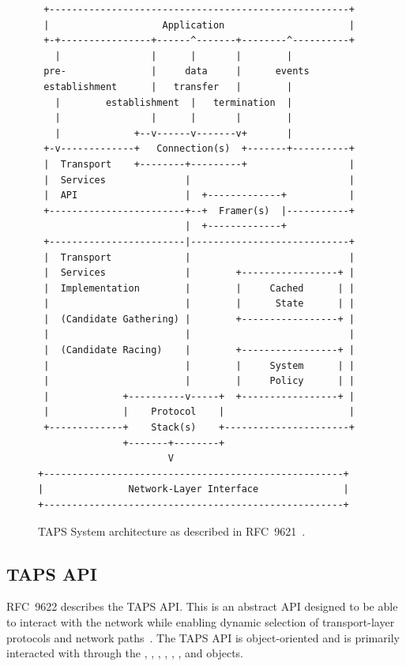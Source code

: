\begin{figure}[htbp]
    \centering
    \begin{BVerbatim}
 +-----------------------------------------------------+
 |                    Application                      |
 +-+----------------+------^-------+--------^----------+
   |                |      |       |        |
 pre-               |     data     |      events
 establishment      |   transfer   |        |
   |        establishment  |   termination  |
   |                |      |       |        |
   |             +--v------v-------v+       |
 +-v-------------+   Connection(s)  +-------+----------+
 |  Transport    +--------+---------+                  |
 |  Services              |                            |
 |  API                   |  +-------------+           |
 +------------------------+--+  Framer(s)  |-----------+
                          |  +-------------+
 +------------------------|----------------------------+
 |  Transport             |                            |
 |  Services              |        +-----------------+ |
 |  Implementation        |        |     Cached      | |
 |                        |        |      State      | |
 |  (Candidate Gathering) |        +-----------------+ |
 |                        |                            |
 |  (Candidate Racing)    |        +-----------------+ |
 |                        |        |     System      | |
 |                        |        |     Policy      | |
 |             +----------v-----+  +-----------------+ |
 |             |    Protocol    |                      |
 +-------------+    Stack(s)    +----------------------+
               +-------+--------+
                       V
+-----------------------------------------------------+
|               Network-Layer Interface               |
+-----------------------------------------------------+
    \end{BVerbatim}
    \caption[TAPS System architecture]{TAPS System architecture as described in RFC~9621~\cite{rfc9621}.}
    \label{fig:tapsArch}
\end{figure}

\subsection{TAPS API}
RFC~9622 describes the TAPS API. This is an abstract API designed to be
able to interact with the network while enabling dynamic selection of
transport-layer protocols and network paths~\cite{rfc9622}.
The TAPS API is object-oriented and is primarily interacted
with through the , ,
, , , ,
 and  objects.

